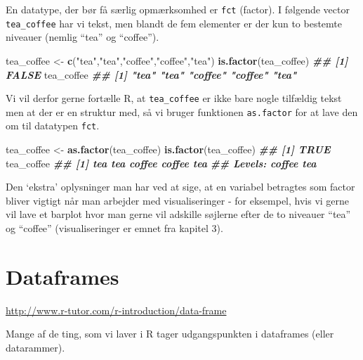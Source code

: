 \documentclass[
]{book}
\newenvironment{Shaded}{\begin{snugshade}}{\end{snugshade}}
\newcommand{\DocumentationTok}[1]{\textcolor[rgb]{0.56,0.35,0.01}{\textbf{\textit{#1}}}}
\newcommand{\FunctionTok}[1]{\textcolor[rgb]{0.13,0.29,0.53}{\textbf{#1}}}
\newcommand{\NormalTok}[1]{#1}
\newcommand{\OtherTok}[1]{\textcolor[rgb]{0.56,0.35,0.01}{#1}}
\newcommand{\StringTok}[1]{\textcolor[rgb]{0.31,0.60,0.02}{#1}}
\theoremstyle{definition}
\theoremstyle{definition}
\theoremstyle{definition}
\theoremstyle{definition}
\theoremstyle{remark}
\begin{document}
En datatype, der bør få særlig opmærksomhed er \texttt{fct} (factor). I følgende vector \texttt{tea\_coffee} har vi tekst, men blandt de fem elementer er der kun to bestemte niveauer (nemlig ``tea'' og ``coffee'').

\begin{Shaded}
\begin{Highlighting}[]
\NormalTok{tea\_coffee }\OtherTok{\textless{}{-}} \FunctionTok{c}\NormalTok{(}\StringTok{"tea"}\NormalTok{,}\StringTok{"tea"}\NormalTok{,}\StringTok{"coffee"}\NormalTok{,}\StringTok{"coffee"}\NormalTok{,}\StringTok{"tea"}\NormalTok{)}
\FunctionTok{is.factor}\NormalTok{(tea\_coffee)}
\DocumentationTok{\#\# [1] FALSE}
\NormalTok{tea\_coffee}
\DocumentationTok{\#\# [1] "tea"    "tea"    "coffee" "coffee" "tea"}
\end{Highlighting}
\end{Shaded}

Vi vil derfor gerne fortælle R, at \texttt{tea\_coffee} er ikke bare nogle tilfældig tekst men at der er en struktur med, så vi bruger funktionen \texttt{as.factor} for at lave den om til datatypen \texttt{fct}.

\begin{Shaded}
\begin{Highlighting}[]
\NormalTok{tea\_coffee }\OtherTok{\textless{}{-}} \FunctionTok{as.factor}\NormalTok{(tea\_coffee)}
\FunctionTok{is.factor}\NormalTok{(tea\_coffee)}
\DocumentationTok{\#\# [1] TRUE}
\NormalTok{tea\_coffee}
\DocumentationTok{\#\# [1] tea    tea    coffee coffee tea   }
\DocumentationTok{\#\# Levels: coffee tea}
\end{Highlighting}
\end{Shaded}

Den `ekstra' oplysninger man har ved at sige, at en variabel betragtes som factor bliver vigtigt når man arbejder med visualiseringer - for eksempel, hvis vi gerne vil lave et barplot hvor man gerne vil adskille søjlerne efter de to niveauer ``tea'' og ``coffee'' (visualiseringer er emnet fra kapitel 3).

\section{Dataframes}\label{dataframes}

\url{http://www.r-tutor.com/r-introduction/data-frame}

Mange af de ting, som vi laver i R tager udgangspunkten i dataframes (eller datarammer).
\end{document}
